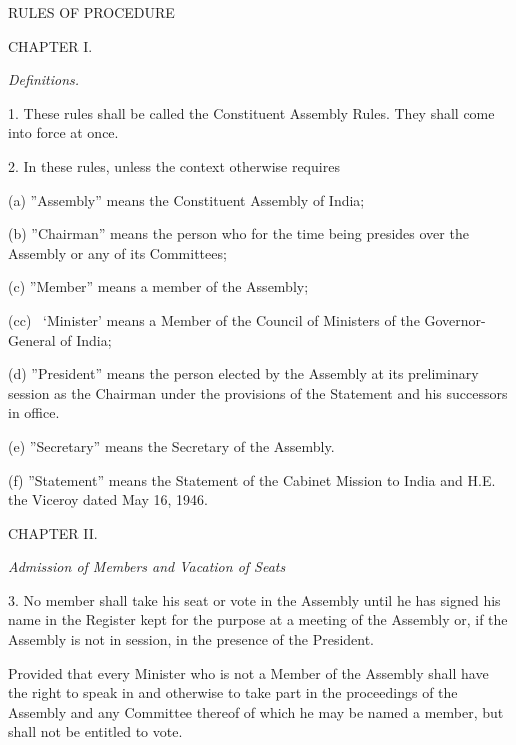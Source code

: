 \begin{center}
RULES OF PROCEDURE\end{center}


\begin{center}
CHAPTER I.\end{center}
\begin{center}
\emph{Definitions.}\end{center}


1. These rules shall be called the Constituent Assembly Rules. They shall come into force at once.



2. In these rules, unless the context otherwise requires\textemdash{}



(a) ''Assembly'' means the Constituent Assembly of India;

(b) ''Chairman'' means the person who for the time being presides over the Assembly or any of its Committees;

(c) ''Member'' means a member of the Assembly;

(cc) ~\textquoteleft{}Minister\textquoteright{} means a Member of the Council of Ministers of the Governor-General of India;

(d) ''President'' means the person elected by the Assembly at its preliminary session as the Chairman under the provisions of the Statement and his successors in office.

(e) ''Secretary'' means the Secretary of the Assembly.

(f) ''Statement'' means the Statement of the Cabinet Mission to India and H.E. the Viceroy dated May 16, 1946.

\begin{center}
\end{center}
\begin{center}
CHAPTER II.\end{center}
\begin{center}
\emph{Ad}\emph{m}\emph{ission of Members and Vacation of Seats}\end{center}
\begin{center}
\end{center}
3. No member shall take his seat or vote in the Assembly until he has signed his name in the Register kept for the purpose at a meeting of the Assembly or, if the Assembly is not in session, in the presence of the President.



Provided that every Minister who is not a Member of the Assembly shall have the right to speak in and otherwise to take part in the proceedings of the Assembly and any Committee thereof of which he may be named a member, but shall not be entitled to vote.



